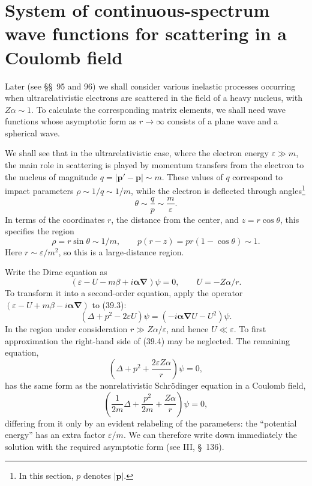 
\section[Wave functions for scattering in a Coulomb field]{System of continuous-spectrum wave functions for scattering in a Coulomb field}

Later (see \S\S~95 and 96) we shall consider various inelastic processes occurring when ultrarelativistic electrons are scattered in the field of a heavy nucleus, with $Z\alpha\sim1$. To calculate the corresponding matrix elements, we shall need wave functions whose asymptotic form as $r\to\infty$ consists of a plane wave and a spherical wave.

We shall see that in the ultrarelativistic case, where the electron energy $\varepsilon\gg m$, the main role in scattering is played by momentum transfers from the electron to the nucleus of magnitude $q=|\mathbf p'-\mathbf p|\sim m$. These values of $q$ correspond to impact parameters $\rho\sim1/q\sim1/m$, while the electron is deflected through angles\footnote{In this section, $p$ denotes $|\mathbf p|$.}
\begin{equation}
\theta\sim\frac qp\sim\frac m\varepsilon.
\tag{39.1}
\end{equation}
In terms of the coordinates $r$, the distance from the center, and $z=r\cos\theta$, this specifies the region
\begin{equation}
\rho=r\sin\theta\sim1/m,
\qquad
p(r-z)=pr(1-\cos\theta)\sim1.
\tag{39.2}
\end{equation}
Here $r\sim\varepsilon/m^2$, so this is a large-distance region.

Write the Dirac equation as
\begin{equation}
(\varepsilon-U-m\beta+i\boldsymbol\alpha\boldsymbol\nabla)\psi=0,
\qquad
U=-Z\alpha/r.
\tag{39.3}
\end{equation}
To transform it into a second-order equation, apply the operator $(\varepsilon-U+m\beta-i\boldsymbol\alpha\boldsymbol\nabla)$ to (39.3):
\begin{equation}
(\Delta+p^2-2\varepsilon U)\psi
=(-i\boldsymbol\alpha\boldsymbol\nabla U-U^2)\psi.
\tag{39.4}
\end{equation}
In the region under consideration $r\gg Z\alpha/\varepsilon$, and hence $U\ll\varepsilon$. To first approximation the right-hand side of (39.4) may be neglected. The remaining equation,
\begin{equation}
\left(\Delta+p^2+\frac{2\varepsilon Z\alpha}{r}\right)\psi=0,
\tag{39.5}
\end{equation}
has the same form as the nonrelativistic Schrödinger equation in a Coulomb field,
\begin{equation}
\left(\frac1{2m}\Delta+\frac{p^2}{2m}+\frac{Z\alpha}{r}\right)\psi=0,
\tag{39.5a}
\end{equation}
differing from it only by an evident relabeling of the parameters: the ``potential energy'' has an extra factor $\varepsilon/m$. We can therefore write down immediately the solution with the required asymptotic form (see III, \S~136).

